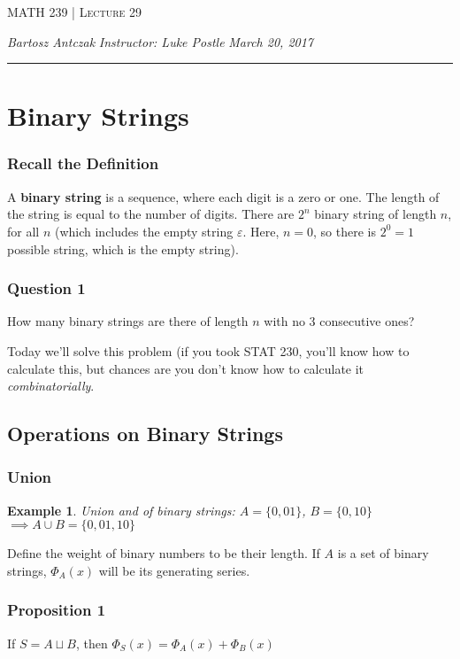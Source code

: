 \documentclass{report}
\newcommand{\lectureNum}{29}
\newcommand{\curDate}{March 20, 2017}
\newcommand{\course}{MATH 239}
\newcommand{\instructor}{Luke Postle}
\newtheorem{ex}{Example}[section]
\begin{document}
\begin{center}
\begin{Large}
\textsc{\course{} | Lecture \lectureNum{}}
\end{Large}
\end{center} 
\noindent \textit{Bartosz Antczak} \hfill
\textit{Instructor: \instructor{}} \hfill
\textit{\curDate{}}
\rule{\textwidth}{0.4pt}
\section{Binary Strings}
\subsubsection{Recall the Definition}
A \textbf{binary string} is a sequence, where each digit is a zero or one. The length of the string is equal to the number of digits. There are $2^n$ binary string of length $n$, for all $n$ (which includes the empty string $\varepsilon$. Here, $n=0$, so there is $2^0=1$ possible string, which is the empty string).
\subsubsection{Question 1}
\begin{center}
How many binary strings are there of length $n$ with no 3 consecutive ones?
\end{center}
Today we'll solve this problem (if you took STAT 230, you'll know how to calculate this, but chances are you don't know how to calculate it \textit{combinatorially}.
\subsection{Operations on Binary Strings}
\subsubsection{Union}
\begin{ex}
Union and of binary strings: $A = \{0, 01\}$, $B = \{0, 10\}$ $\implies A \cup B = \{0, 01, 10\}$
\end{ex}
Define the weight of binary numbers to be their length. If $A$ is a set of binary strings, $\Phi_A(x)$ will be its generating series.
\subsubsection{Proposition 1}
\begin{center}
If $S = A \sqcup B$, then $\Phi_S(x) = \Phi_A(x) + \Phi_B(x)$
\end{center}
\end{document}
